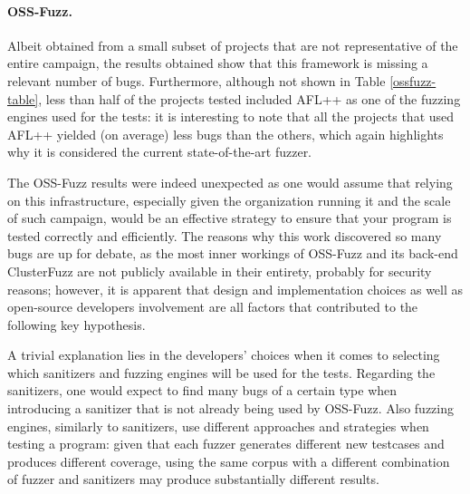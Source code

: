 \paragraph{OSS-Fuzz.} Albeit obtained from a small subset of projects that are not representative of the entire campaign, the results obtained show that this framework is missing a relevant number of bugs. Furthermore, although not shown in Table \ref{ossfuzz-table}, less than half of the projects tested included AFL++ as one of the fuzzing engines used for the tests: it is interesting to note that all the projects that used AFL++ yielded (on average) less bugs than the others, which again highlights why it is considered the current state-of-the-art fuzzer.

The OSS-Fuzz results were indeed unexpected as one would assume that relying on this infrastructure, especially given the organization running it and the scale of such campaign, would be an effective strategy to ensure that your program is tested correctly and efficiently. The reasons why this work discovered so many bugs are up for debate, as the most inner workings of OSS-Fuzz and its back-end ClusterFuzz are not publicly available in their entirety, probably for security reasons; however, it is apparent that design and implementation choices as well as open-source developers involvement are all factors that contributed to the following key hypothesis.

A trivial explanation lies in the developers' choices when it comes to selecting which sanitizers and fuzzing engines will be used for the tests. Regarding the sanitizers, one would expect to find many bugs of a certain type when introducing a sanitizer that is not already being used by OSS-Fuzz. Also fuzzing engines, similarly to sanitizers, use different approaches and strategies when testing a program: given that each fuzzer generates different new testcases and produces different coverage, using the same corpus with a different combination of fuzzer and sanitizers may produce substantially different results. 

